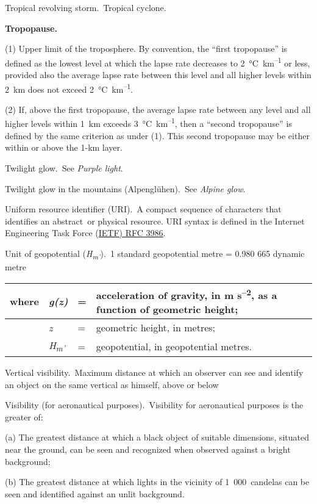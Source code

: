 Tropical revolving storm. Tropical cyclone.

\textbf{Tropopause.}

(1) Upper limit of the troposphere. By convention, the ``first tropopause'' is defined as the lowest level at which the lapse rate decreases to 2~°C~km\textsuperscript{--1} or less, provided also the average lapse rate between this level and all higher levels within 2~km does not exceed 2~°C~km\textsuperscript{--1}.

(2) If, above the first tropopause, the average lapse rate between any level and all higher levels within 1~km exceeds 3~°C~km\textsuperscript{--1}, then a ``second tropopause'' is defined by the same criterion as under (1). This second tropopause may be either within or above the 1-km layer.

Twilight glow. See \emph{Purple light}.

Twilight glow in the mountains (Alpenglühen). See \emph{Alpine glow}.

Uniform resource identifier (URI). A compact sequence of characters that identifies an abstract~or physical resource. URI syntax is defined in the Internet Engineering Task Force (\href{http://www.ietf.org/rfc/rfc3986.txt}{IETF) RFC 3986}.

Unit of geopotential (\emph{H\textsubscript{m'}}). 1 standard geopotential metre = 0.980 665 dynamic metre

\begin{longtable}[]{@{}llll@{}}
\toprule
where & \emph{g(z)} & = & acceleration of gravity, in m s\textsuperscript{--2}, as a function of geometric height;\tabularnewline
\midrule
\endhead
& \emph{z} & = & geometric height, in metres;\tabularnewline
& \emph{H\textsubscript{m'}} & = & geopotential, in geopotential metres.\tabularnewline
\bottomrule
\end{longtable}

Vertical visibility. Maximum distance at which an observer can see and identify an object on the same vertical as himself, above or below

Visibility (for aeronautical purposes). Visibility for aeronautical purposes is the greater of:

(a) The greatest distance at which a black object of suitable dimensions, situated near the ground, can be seen and recognized when observed against a bright background;

(b) The greatest distance at which lights in the vicinity of 1~000~candelas can be seen and identified against an unlit background.

